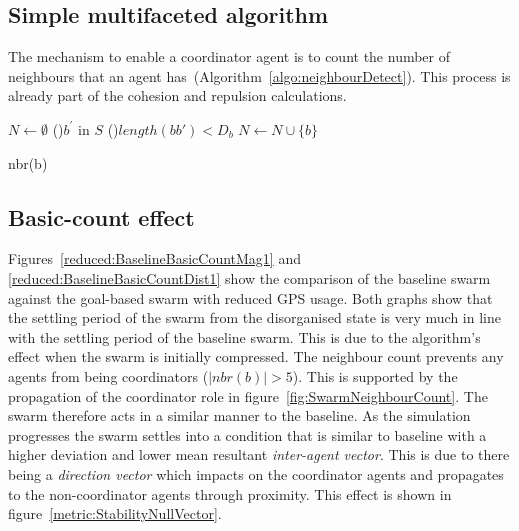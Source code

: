 \subsection{Simple multifaceted algorithm}
The mechanism to enable a coordinator agent is to count the number of neighbours that an agent has~(Algorithm~\ref{algo:neighbourDetect}). This process is already part of the cohesion and repulsion calculations.

\begin{algorithm}[H]
\DontPrintSemicolon
\SetAlgoLined
{}
$N \longleftarrow \emptyset$\;
\ForEach(){$b^{'}$ in $S$}
{
  \If(){$length(bb') < D_{b}$}
  {
     $N \longleftarrow N \cup \{b\}$
  }
}
\caption[Neighbour Detection]{nbr(b)}\label{algo:neighbourDetect}
\end{algorithm}

\subsection{Basic-count effect\label{section:compareBaselineBasicCount1}}
Figures~\ref{reduced:BaselineBasicCountMag1} and \ref{reduced:BaselineBasicCountDist1} show the comparison of the baseline swarm against the goal-based swarm with reduced GPS usage. Both graphs show that the settling period of the swarm from the disorganised state is very much in line with the settling period of the baseline swarm. This is due to the algorithm's effect when the swarm is initially compressed. The neighbour count prevents any agents from being coordinators ($|nbr(b)| > 5$). This is supported by the propagation of the coordinator role in figure~\ref{fig:SwarmNeighbourCount}. The swarm therefore acts in a similar manner to the baseline. As the simulation progresses the swarm settles into a condition that is similar to baseline with a higher deviation and lower mean resultant \textit{inter-agent vector}. This is due to there being a \textit{direction vector} which impacts on the coordinator agents and propagates to the non-coordinator agents through proximity. This effect is shown in figure~\ref{metric:StabilityNullVector}. 


